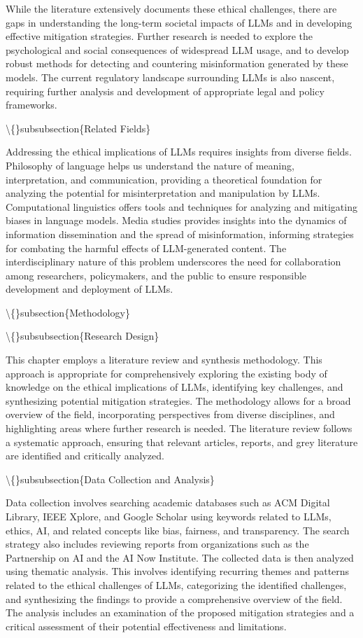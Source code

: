 \documentclass{article}
\begin{document}
While the literature extensively documents these ethical challenges, there are gaps in understanding the long-term societal impacts of LLMs and in developing effective mitigation strategies.  Further research is needed to explore the psychological and social consequences of widespread LLM usage, and to develop robust methods for detecting and countering misinformation generated by these models. The current regulatory landscape surrounding LLMs is also nascent, requiring further analysis and development of appropriate legal and policy frameworks.

\textbackslash\{\}subsubsection\{Related Fields\}

Addressing the ethical implications of LLMs requires insights from diverse fields. Philosophy of language helps us understand the nature of meaning, interpretation, and communication, providing a theoretical foundation for analyzing the potential for misinterpretation and manipulation by LLMs. Computational linguistics offers tools and techniques for analyzing and mitigating biases in language models. Media studies provides insights into the dynamics of information dissemination and the spread of misinformation, informing strategies for combating the harmful effects of LLM-generated content. The interdisciplinary nature of this problem underscores the need for collaboration among researchers, policymakers, and the public to ensure responsible development and deployment of LLMs.

\textbackslash\{\}subsection\{Methodology\}

\textbackslash\{\}subsubsection\{Research Design\}

This chapter employs a literature review and synthesis methodology. This approach is appropriate for comprehensively exploring the existing body of knowledge on the ethical implications of LLMs, identifying key challenges, and synthesizing potential mitigation strategies. The methodology allows for a broad overview of the field, incorporating perspectives from diverse disciplines, and highlighting areas where further research is needed. The literature review follows a systematic approach, ensuring that relevant articles, reports, and grey literature are identified and critically analyzed.

\textbackslash\{\}subsubsection\{Data Collection and Analysis\}

Data collection involves searching academic databases such as ACM Digital Library, IEEE Xplore, and Google Scholar using keywords related to LLMs, ethics, AI, and related concepts like bias, fairness, and transparency. The search strategy also includes reviewing reports from organizations such as the Partnership on AI and the AI Now Institute. The collected data is then analyzed using thematic analysis. This involves identifying recurring themes and patterns related to the ethical challenges of LLMs, categorizing the identified challenges, and synthesizing the findings to provide a comprehensive overview of the field. The analysis includes an examination of the proposed mitigation strategies and a critical assessment of their potential effectiveness and limitations.
\end{document}
